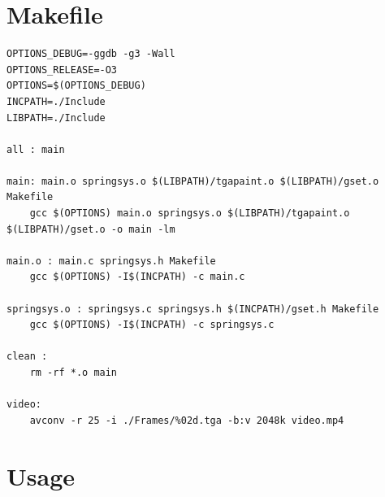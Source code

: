 \documentclass[12pt, a4paper]{article}
\begin{document}
\section{Makefile}

\begin{scriptsize}
\begin{ttfamily}
\begin{lstlisting}
OPTIONS_DEBUG=-ggdb -g3 -Wall
OPTIONS_RELEASE=-O3 
OPTIONS=$(OPTIONS_DEBUG)
INCPATH=./Include
LIBPATH=./Include

all : main

main: main.o springsys.o $(LIBPATH)/tgapaint.o $(LIBPATH)/gset.o Makefile 
	gcc $(OPTIONS) main.o springsys.o $(LIBPATH)/tgapaint.o $(LIBPATH)/gset.o -o main -lm

main.o : main.c springsys.h Makefile
	gcc $(OPTIONS) -I$(INCPATH) -c main.c

springsys.o : springsys.c springsys.h $(INCPATH)/gset.h Makefile
	gcc $(OPTIONS) -I$(INCPATH) -c springsys.c

clean : 
	rm -rf *.o main

video:
	avconv -r 25 -i ./Frames/%02d.tga -b:v 2048k video.mp4

\end{lstlisting}
\end{ttfamily}
\end{scriptsize}

\section{Usage}
\end{document}
